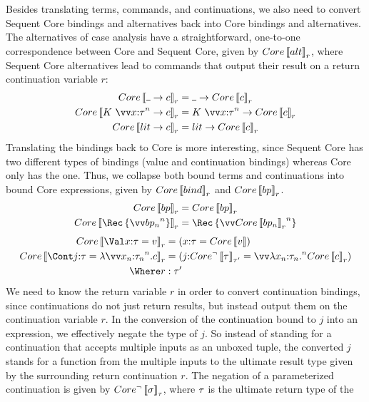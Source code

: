 \documentclass{article}
\begin{document}
Besides translating terms, commands, and continuations, we also need to convert
Sequent Core bindings and alternatives back into Core bindings and alternatives.
The alternatives of case analysis have a straightforward, one-to-one
correspondence between Core and Sequent Core, given by $Core\left\llbracket{alt}\right\rrbracket_{r}$,
where Sequent Core alternatives lead to commands that output their result on a
return continuation variable $r$:
\begin{align*}
  Core\trans{\blank \to \cmd}_{r}
  &=
  \blank \to Core\trans{\cmd}_{r}
  \\
  Core\trans{K ~ \vect[n]{\ann x \ty} \to \cmd}_{r}
  &=
  K ~ \vect[n]{\ann x \ty} \to Core\trans{\cmd}_{r}
  \\
  Core\trans{\lit \to \cmd}_{r}
  &=
  \lit \to Core\trans{\cmd}_{r}
\end{align*}
Translating the bindings back to Core is more interesting, since Sequent Core
has two different types of bindings (value and continuation bindings) whereas
Core only has the one.  Thus, we collapse both bound terms and continuations
into bound Core expressions, given by $Core\left\llbracket{bind}\right\rrbracket_{r}$ and
$Core\left\llbracket{bp}\right\rrbracket_{r}$.
\begin{align*}
  Core\trans{\nonrec{\bp}}_{r}
  &=
  \nonrec{Core\trans{\bp}_{r}}
  \\
  Core\trans{\rec{\vect[n]{\bp_n}}}_{r}
  &=
  \rec{\vect[n]{Core\trans{\bp_n}_{r}}}
\end{align*}
\begin{align*}
  Core\trans{\bindv{\ann x \ty}{\tm}}_{r}
  &=
  (\ann x \ty = Core\trans{\tm})
  \\
  Core\trans{
    \bindk{\ann j \ty}{\fnk{\vect[n]{\ann{x_n}{\ty_n}}}\cmd}
  }_{r}
  &=
  (
    \ann{j}{Core^\neg\trans{\ty}_{\ty'}}
    =
    \vect[n]{\fn{\ann{x_n}{\ty_n}}} Core\trans{\cmd}_{r}
    )
  \\
  \Where
  r &: \ty'
\end{align*}
We need to know the return variable $r$ in order to convert continuation
bindings, since continuations do not just return results, but instead output
them on the continuation variable $r$.  In the conversion of the continuation
bound to $j$ into an expression, we effectively negate the type of $j$.  So
instead of standing for a continuation that accepts multiple inputs as an
unboxed tuple, the converted $j$ stands for a function from the multiple inputs
to the ultimate result type given by the surrounding return continuation $r$.
The negation of a parameterized continuation is given by
$Core^\neg\left\llbracket{\sigma}\right\rrbracket_{\tau}$, where $\tau$ is the ultimate return type of the
\end{document}
